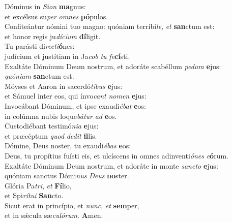 \evenverse Dóminus in \textit{Si}\textit{on} \textbf{ma}gnus:~\*\\
\evenverse et excélsus su\textit{per} \textit{om}\textit{nes} \textbf{pó}pulos.\\
\oddverse Confiteántur nómini tuo magno: quóniam terríbi\textit{le}, \textit{et} \textbf{san}ctum est:~\*\\
\oddverse et honor regis ju\textit{dí}\textit{ci}\textit{um} \textbf{dí}ligit.\\
\evenverse Tu parásti di\textit{re}\textit{cti}\textbf{ó}nes:~\*\\
\evenverse judícium et justítiam in Ja\textit{cob} \textit{tu} \textit{fe}\textbf{cí}sti.\\
\oddverse Exaltáte Dóminum Deum nostrum, et adoráte scabéllum \textit{pe}\textit{dum} \textbf{e}jus:~\*\\
\oddverse \textit{quó}\textit{ni}\textit{am} \textbf{san}ctum est.\\
\evenverse Móyses et Aaron in sacerdó\textit{ti}\textit{bus} \textbf{e}jus:~\*\\
\evenverse et Sámuel inter eos, qui ínvo\textit{cant} \textit{no}\textit{men} \textbf{e}jus:\\
\oddverse Invocábant Dóminum, et ipse exaudi\textit{é}\textit{bat} \textbf{e}os:~\*\\
\oddverse in colúmna nubis loque\textit{bá}\textit{tur} \textit{ad} \textbf{e}os.\\
\evenverse Custodiébant testimó\textit{ni}\textit{a} \textbf{e}jus:~\*\\
\evenverse et præcéptum \textit{quod} \textit{de}\textit{dit} \textbf{il}lis.\\
\oddverse Dómine, Deus noster, tu exaudi\textit{é}\textit{bas} \textbf{e}os:~\*\\
\oddverse Deus, tu propítius fuísti eis, et ulcíscens in omnes adinventi\textit{ó}\textit{nes} \textit{e}\textbf{ó}rum.\\
\evenverse Exaltáte Dóminum Deum nostrum, et adoráte in monte \textit{san}\textit{cto} \textbf{e}jus:~\*\\
\evenverse quóniam sanctus Dómi\textit{nus} \textit{De}\textit{us} \textbf{no}ster.\\
\oddverse Glória Pa\textit{tri}, \textit{et} \textbf{Fí}lio,~\*\\
\oddverse et Spi\textit{rí}\textit{tu}\textit{i} \textbf{San}cto.\\
\evenverse Sicut erat in princípio, et \textit{nunc}, \textit{et} \textbf{sem}per,~\*\\
\evenverse et in sǽcula sæ\textit{cu}\textit{ló}\textit{rum}. \textbf{A}men.\\
